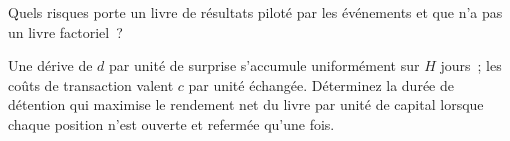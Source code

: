 \begin{interviewq}\label{iq:s1:earnings:5}
Quels risques porte un livre de résultats piloté par les événements et que n'a pas un livre factoriel~?
\end{interviewq}

\begin{interviewq}\label{iq:s1:earnings:6}
Une dérive de $d$ par unité de surprise s'accumule uniformément sur $H$ jours~; les coûts de transaction valent $c$ par unité échangée. Déterminez la durée de détention qui maximise le rendement net du livre
par unité de capital lorsque chaque position n'est ouverte et refermée qu'une fois.
\end{interviewq}
